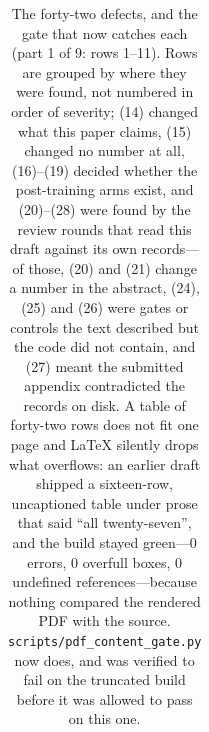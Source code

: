 \documentclass{article}
\begin{document}
\begin{table}[p]
\begin{tabular}{@{}p{0.6cm}p{7.3cm}p{7.3cm}@{}}
\bottomrule
\end{tabular}
\caption{The forty-two defects, and the gate that now catches each (part 1 of 9: rows 1--11).  Rows are grouped by where they
were found, not numbered in order of severity; (14) changed what this paper claims,
(15) changed no number at all, (16)--(19) decided whether the post-training arms exist,
and (20)--(28) were found by the review rounds that read this draft against its own
records---of those, (20) and (21) change a number in the abstract, (24), (25) and (26)
were gates or controls the text described but the code did not contain, and (27) meant
the submitted appendix contradicted the records on disk.  A table of forty-two rows does not fit one page and LaTeX silently drops what overflows: an earlier draft shipped a sixteen-row, uncaptioned table under prose that said ``all twenty-seven'', and the build stayed green---0 errors, 0 overfull boxes, 0 undefined references---because nothing compared the rendered PDF with the source.  \texttt{scripts/pdf\_content\_gate.py} now does, and was verified to fail on the truncated build before it was allowed to pass on this one.}
\label{tab:defects}
\end{table}
\end{document}
